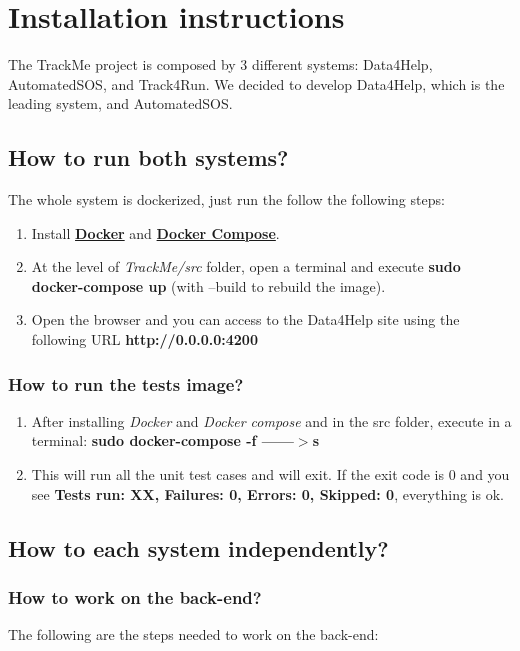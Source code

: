 \documentclass[a4paper, hidelinks, 12pt]{report}
\begin{document}
	\chapter{Installation instructions}
The TrackMe project is composed by 3 different systems: Data4Help, AutomatedSOS, and Track4Run. We decided to develop Data4Help, which is the leading system, and AutomatedSOS.

	\section{How to run both systems?}
	The whole system is dockerized, just run the follow the following steps:

	\begin{enumerate}
	\item Install \href{https://docs.docker.com/install/}{\textbf{Docker}} and \href{https://docs.docker.com/compose/install/}{\textbf{Docker Compose}}.
	\item At the level of \textit{TrackMe/src} folder, open a terminal and execute
	\textbf{ sudo docker-compose up} (with --build to rebuild the image).
	\item Open the browser and you can access to the Data4Help site using the following URL
		\textbf{http://0.0.0.0:4200}
	\end{enumerate}
	
	\subsection{How to run the tests image?}
	\begin{enumerate}
	\item After installing \textit{Docker} and \textit{Docker compose} and in the src folder, execute in a terminal: 
	\textbf{sudo docker-compose -f  ------$>$s}
	\item This will run all the unit test cases and will exit. If the exit code is 0 and you see \textbf{Tests run: XX, Failures: 0, Errors: 0, Skipped: 0}, everything is ok.
	\end{enumerate}
	 
	\section{How to each system independently?}
	\subsection{How to work on the back-end?}
	The following are the steps needed to work on the back-end:
	
\end{document}
